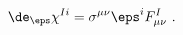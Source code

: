 \begin{equation} \label{eps-gaugino}
  \de_\eps \chi^{Ii} = \sigma^{\mu\nu} \eps^i F^I_{\mu\nu}\ .
 \end{equation}


